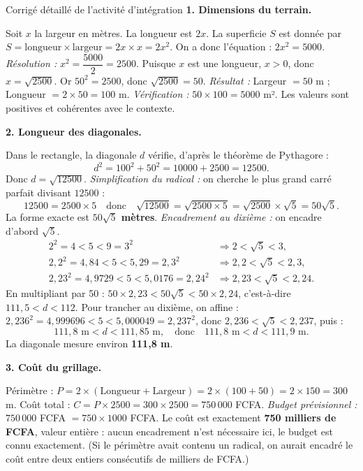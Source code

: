 \documentclass[11pt]{article}
\newcounter{popsec}
\newcounter{popsub}
\newcommand{\courssub}[1]{%
  \stepcounter{popsub}%
  \par\vspace{9pt}\noindent{\popxbold\fontsize{11.5}{13}\selectfont\color{popink}{\color{poporange}\thepopsec.\thepopsub}\hspace{6pt}#1}\par\nopagebreak\vspace{4pt}
}
\begin{document}
\courssub{Démarche et corrigé commenté}
\begin{exoresolu}{Corrigé détaillé de l'activité d'intégration}
\textbf{1. Dimensions du terrain.}\par
Soit $x$ la largeur en mètres. La longueur est $2x$.
La superficie $S$ est donnée par $S = \text{longueur} \times \text{largeur} = 2x \times x = 2x^2$.
On a donc l'équation : $2x^2 = 5000$.
\emph{Résolution :} $x^2 = \dfrac{5000}{2} = 2500$.
Puisque $x$ est une longueur, $x > 0$, donc $x = \sqrt{2500}$.
Or $50^2 = 2500$, donc $\sqrt{2500} = 50$.
\emph{Résultat :} Largeur $= 50$ m ; Longueur $= 2 \times 50 = 100$ m.
\emph{Vérification :} $50 \times 100 = 5000$ m². Les valeurs sont positives et cohérentes avec le contexte.

\textbf{2. Longueur des diagonales.}\par
Dans le rectangle, la diagonale $d$ vérifie, d'après le théorème de Pythagore :
\[ d^2 = 100^2 + 50^2 = 10000 + 2500 = 12500. \]
Donc $d = \sqrt{12500}$.
\emph{Simplification du radical :} on cherche le plus grand carré parfait divisant $12500$ :
\[ 12500 = 2500 \times 5 \quad\text{donc}\quad \sqrt{12500} = \sqrt{2500 \times 5} = \sqrt{2500} \times \sqrt{5} = 50\sqrt{5}. \]
La forme exacte est \textbf{$50\sqrt{5}$ mètres}.
\emph{Encadrement au dixième :} on encadre d'abord $\sqrt{5}$.
\begin{align*}
2^2 = 4 < 5 < 9 = 3^2 &\Rightarrow 2 < \sqrt{5} < 3,\\
2,2^2 = 4,84 < 5 < 5,29 = 2,3^2 &\Rightarrow 2,2 < \sqrt{5} < 2,3,\\
2,23^2 = 4,9729 < 5 < 5,0176 = 2,24^2 &\Rightarrow 2,23 < \sqrt{5} < 2,24.
\end{align*}
En multipliant par 50 : $50 \times 2,23 < 50\sqrt{5} < 50 \times 2,24$, c'est-à-dire $111,5 < d < 112$. Pour trancher au dixième, on affine : $2,236^2 = 4,999696 < 5 < 5,000049 = 2,237^2$, donc $2,236 < \sqrt{5} < 2,237$, puis :
\[ 111,8 \text{ m} < d < 111,85 \text{ m}, \quad\text{donc}\quad 111,8 \text{ m} < d < 111,9 \text{ m}. \]
La diagonale mesure environ \textbf{111,8 m}.

\textbf{3. Coût du grillage.}\par
Périmètre : $P = 2 \times (\text{Longueur} + \text{Largeur}) = 2 \times (100 + 50) = 2 \times 150 = 300$ m.
Coût total : $C = P \times 2500 = 300 \times 2500 = 750\,000$ FCFA.
\emph{Budget prévisionnel :} $750\,000$ FCFA $= 750 \times 1000$ FCFA. Le coût est exactement \textbf{750 milliers de FCFA}, valeur entière : aucun encadrement n'est nécessaire ici, le budget est connu exactement. (Si le périmètre avait contenu un radical, on aurait encadré le coût entre deux entiers consécutifs de milliers de FCFA.)


\end{exoresolu}
\end{document}
